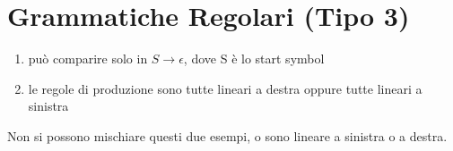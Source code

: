 \section{Grammatiche Regolari (Tipo 3)}
\begin{enumerate}
    \item \eps può comparire solo in $S \rightarrow \epsilon$, dove S è lo start symbol
    \item le regole di produzione sono tutte lineari a destra oppure tutte lineari a sinistra
\end{enumerate}
Non si possono mischiare questi due esempi, o sono lineare a sinistra o a destra.
